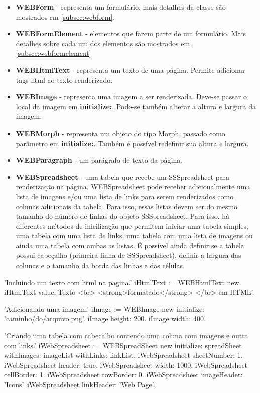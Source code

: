 \begin{itemize}
 \item \textbf{WEBForm} - representa um formulário, mais detalhes da classe são mostrados em \ref{subsec:webform}.
 \item \textbf{WEBFormElement} - elementos que fazem parte de um formulário. Mais detalhes sobre cada um dos elementos são mostrados em \ref{subsec:webformelement}
 \item \textbf{WEBHtmlText} - representa um texto de uma página. Permite adicionar tags html ao texto renderizado.
 \item \textbf{WEBImage} - representa uma imagem a ser renderizada. Deve-se passar o local da imagem em \textbf{initialize:}. Pode-se também alterar a altura e largura da imagem.
 \item \textbf{WEBMorph} - representa um objeto do tipo Morph, passado como parâmetro em \textbf{initialize:}. Também é possível redefinir sua altura e largura.
 \item \textbf{WEBParagraph} - um parágrafo de texto da página.
 \item \textbf{WEBSpreadsheet} - uma tabela que recebe um SSSpreadsheet para renderização na página. WEBSpreadsheet pode receber adicionalmente uma lista de imagens e/ou uma lista de links para serem renderizados como colunas adicionais da tabela. 
 Para isso, essas listas devem ser do mesmo tamanho do número de linhas do objeto SSSpreadsheet. Para isso, há diferentes métodos de inicilização que permitem iniciar uma tabela simples, uma tabela com uma lista de links, uma tabela com uma lista de imagens ou ainda uma tabela com ambas as listas.
 É possível ainda definir se a tabela possui cabeçalho (primeira linha de SSSpreadsheet), definir a largura das colunas e o tamanho da borda das linhas e das células.
\end{itemize}

\begin{godCode}
'Incluindo um texto com html na pagina.'
iHtmlText := WEBHtmlText new.
iHtmlText value:'Texto <br> <strong>formatado</strong> </br> em HTML'.

'Adicionando uma imagem.'
iImage := WEBImage new initialize: 'caminho/do/arquivo.png'.
iImage height: 200.
iImage width: 400.

'Criando uma tabela com cabecalho contendo uma coluna com imagens e outra com links.'
iWebSpreadsheet := WEBSpreadSheet new initialize: spreadSheet withImages: imageList withLinks: linkList.
iWebSpreadsheet sheetNumber: 1.
iWebSpreadsheet header: true.
iWebSpreadsheet width: 1000.
iWebSpreadsheet cellBorder: 1.
iWebSpreadsheet rowBorder: 0.
iWebSpreadsheet imageHeader: 'Icons'.
iWebSpreadsheet linkHeader: 'Web Page'.
\end{godCode}



